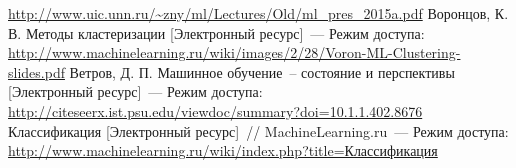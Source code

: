 \begin{thebibliography}{9}
  \emindent\url{http://www.uic.unn.ru/~zny/ml/Lectures/Old/ml_pres_2015a.pdf}
   Воронцов, К. В. Методы кластеризации [Электронный ресурс]~--- Режим доступа:\\
  \emindent\url{http://www.machinelearning.ru/wiki/images/2/28/Voron-ML-Clustering-slides.pdf}
   Ветров, Д. П. Машинное обучение~-- состояние и перспективы [Электронный ресурс]~--- Режим доступа:\\
  \emindent\url{http://citeseerx.ist.psu.edu/viewdoc/summary?doi=10.1.1.402.8676}
   Классификация [Электронный ресурс]~// MachineLearning.ru~--- Режим доступа:\\
  \emindent\href{http://www.machinelearning.ru/wiki/index.php?title=%D0%9A%D0%BB%D0%B0%D1%81%D1%81%D0%B8%D1%84%D0%B8%D0%BA%D0%B0%D1%86%D0%B8%D1%8F}{\small http://www.machinelearning.ru/wiki/index.php?title=Классификация}
\end{thebibliography}
